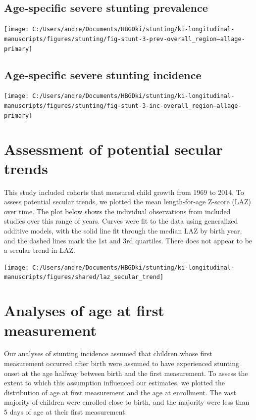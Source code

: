 \documentclass[
  9pt,
]{book}
\begin{document}
\hypertarget{age-specific-severe-stunting-prevalence}{%
\section{Age-specific severe stunting prevalence}\label{age-specific-severe-stunting-prevalence}}

\texttt{[image: C:/Users/andre/Documents/HBGDki/stunting/ki-longitudinal-manuscripts/figures/stunting/fig-stunt-3-prev-overall\_region--allage-primary]}

\hypertarget{age-specific-severe-stunting-incidence}{%
\section{Age-specific severe stunting incidence}\label{age-specific-severe-stunting-incidence}}

\texttt{[image: C:/Users/andre/Documents/HBGDki/stunting/ki-longitudinal-manuscripts/figures/stunting/fig-stunt-3-inc-overall\_region--allage-primary]}

\hypertarget{secular-trends}{%
\chapter{Assessment of potential secular trends}\label{secular-trends}}

\raggedright

This study included cohorts that measured child growth from 1969 to 2014. To assess potential secular trends, we plotted the mean length-for-age Z-score (LAZ) over time. The plot below shows the individual observations from included studies over this range of years. Curves were fit to the data using generalized additive models, with the solid line fit through the median LAZ by birth year, and the dashed lines mark the 1st and 3rd quartiles. There does not appear to be a secular trend in LAZ.

\texttt{[image: C:/Users/andre/Documents/HBGDki/stunting/ki-longitudinal-manuscripts/figures/shared/laz\_secular\_trend]}

\hypertarget{age-meas}{%
\chapter{Analyses of age at first measurement}\label{age-meas}}

\raggedright

Our analyses of stunting incidence assumed that children whose first measurement occurred after birth were assumed to have experienced stunting onset at the age halfway between birth and the first measurement. To assess the extent to which this assumption influenced our estimates, we plotted the distribution of age at first measurement and the age at enrollment. The vast majority of children were enrolled close to birth, and the majority were less than 5 days of age at their first measurement.
\end{document}

